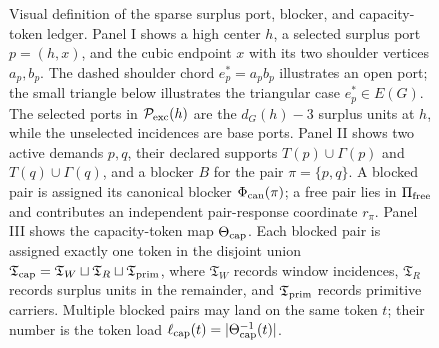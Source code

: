 \documentclass[11pt]{article}
\begin{document}
\begin{figure}[t]
{%
}
\caption[Visual definition of the sparse surplus token ledger]{Visual definition of the sparse surplus port, blocker, and capacity-token ledger.  Panel I shows a high center \(h\), a selected surplus port \(p=(h,x)\), and the cubic endpoint \(x\) with its two shoulder vertices \(a_p,b_p\).  The dashed shoulder chord \(e_p^*=a_pb_p\) illustrates an open port; the small triangle below illustrates the triangular case \(e_p^*\in E(G)\).  The selected ports in \(\mathcal P_{\rm exc}(h)\) are the \(d_G(h)-3\) surplus units at \(h\), while the unselected incidences are base ports.  Panel II shows two active demands \(p,q\), their declared supports \(T(p)\cup\Gamma(p)\) and \(T(q)\cup\Gamma(q)\), and a blocker \(B\) for the pair \(\pi=\{p,q\}\).  A blocked pair is assigned its canonical blocker \(\Phi_{\rm can}(\pi)\); a free pair lies in \(\Pi_{\rm free}\) and contributes an independent pair-response coordinate \(r_\pi\).  Panel III shows the capacity-token map \(\Theta_{\rm cap}\).  Each blocked pair is assigned exactly one token in the disjoint union \(\mathfrak T_{\rm cap}=\mathfrak T_W\sqcup\mathfrak T_R\sqcup\mathfrak T_{\rm prim}\), where \(\mathfrak T_W\) records window incidences, \(\mathfrak T_R\) records surplus units in the remainder, and \(\mathfrak T_{\rm prim}\) records primitive carriers.  Multiple blocked pairs may land on the same token \(t\); their number is the token load \(\ell_{\rm cap}(t)=|\Theta_{\rm cap}^{-1}(t)|\).}
\label{fig:sparse-surplus-token-gadget}
\end{figure}
\end{document}
